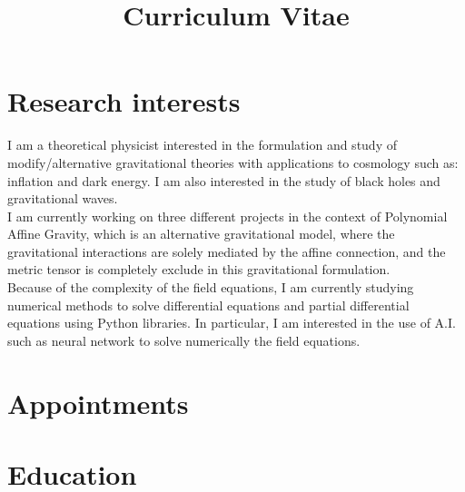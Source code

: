 \documentclass[11pt,a4paper,sans]{moderncv} %
\title{Curriculum Vitae}
\begin{document}
\makecvtitle %

\section{Research interests}

I am a theoretical physicist interested in the formulation and study of modify/alternative gravitational theories with applications to cosmology such as: inflation and dark energy. I am also interested in the study of black holes and gravitational waves.\\

I am currently working on three different projects in the context of Polynomial Affine Gravity, which is an alternative gravitational model, where the gravitational interactions are solely mediated by the affine connection, and the metric tensor is completely exclude in this gravitational formulation.\\

Because of the complexity of the field equations, I am currently studying numerical methods to solve differential equations and partial differential equations using Python libraries. In particular, I am interested in the use of A.I. such as neural network to solve numerically the field equations. 

\section{Appointments}


\section{Education}




\end{document}
